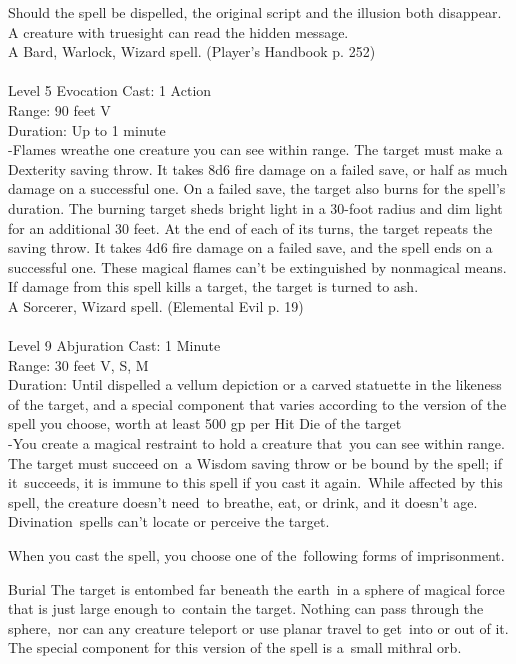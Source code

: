 \documentclass[10pt,twocolumn]{report}
\begin{document}
Should the spell be dispelled, the original script and the illusion both disappear.
A creature with truesight can read the hidden message.\\
A Bard, Warlock, Wizard spell. (Player's Handbook p. 252) \\


 \\
Level 5 \quad Evocation \quad Cast: 1 Action\\
Range: 90 feet \quad V\\
Duration: Up to 1 minute \quad \\
-Flames wreathe one creature you can see within range. The target must make a Dexterity saving throw. It takes 8d6 fire damage on a failed save, or half as much damage on a successful one. On a failed save, the target also burns for the spell’s duration. The burning target sheds bright light in a 30-foot radius and dim light for an additional 30 feet. At the end of each of its turns, the target repeats the saving throw. It takes 4d6 fire damage on a failed save, and the spell ends on a successful one. These magical flames can’t be extinguished by nonmagical means.
If damage from this spell kills a target, the target is turned to ash.\\
A Sorcerer, Wizard spell. (Elemental Evil p. 19) \\


 \\
Level 9 \quad Abjuration \quad Cast: 1 Minute\\
Range: 30 feet \quad V, S, M\\
Duration: Until dispelled \quad a vellum depiction or a carved statuette in the likeness of the target, and a special component that varies according to the version of the spell you choose, worth at least 500 gp per Hit Die of the target\\
-You create a magical restraint to hold a creature that you can see within range.
The target must succeed on a Wisdom saving throw or be bound by the spell; if it succeeds, it is immune to this spell if you cast it again. While affected by this spell, the creature doesn't need to breathe, eat, or drink, and it doesn’t age. Divination spells can’t locate or perceive the target.

When you cast the spell, you choose one of the following forms of imprisonment. 

Burial
The target is entombed far beneath the earth in a sphere of magical force that is just large enough to contain the target. Nothing can pass through the sphere, nor can any creature teleport or use planar travel to get into or out of it.
The special component for this version of the spell is a small mithral orb.
\end{document}
